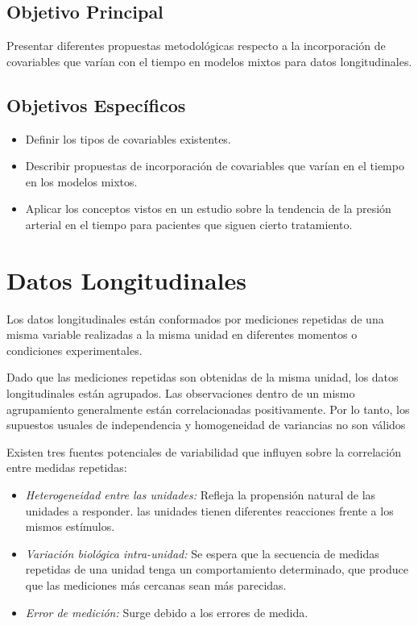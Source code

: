 \documentclass[spanish]{article}
\numberwithin{figure}{subsection}
\numberwithin{equation}{subsection}
\numberwithin{table}{subsection}
\begin{document}
\subsection{Objetivo Principal}

Presentar diferentes propuestas metodológicas respecto a la incorporación de
covariables que varían con el tiempo en modelos mixtos para datos
longitudinales.

\subsection{Objetivos Específicos}

\begin{itemize}
	\item Definir los tipos de covariables existentes.
	\item Describir propuestas de incorporación de covariables que varían en el
	tiempo en los modelos mixtos.
	\item Aplicar los conceptos vistos en un estudio sobre la tendencia de la
		  presión arterial en el tiempo para pacientes que siguen cierto
		  tratamiento.
\end{itemize}

\newpage
\section{Datos Longitudinales}

Los datos longitudinales están conformados por mediciones repetidas de una misma
variable realizadas a la misma unidad en diferentes momentos o condiciones
experimentales.

Dado que las mediciones repetidas son obtenidas de la misma unidad, los datos
longitudinales están agrupados. Las observaciones dentro de un mismo
agrupamiento generalmente están correlacionadas positivamente. Por lo tanto, los
supuestos usuales de independencia y homogeneidad de variancias no son válidos

Existen tres fuentes potenciales de variabilidad que influyen sobre la
correlación entre medidas repetidas:

\begin{itemize}
	\item \textit{Heterogeneidad entre las unidades:} Refleja la propensión
	natural de las unidades a responder. las unidades tienen diferentes
	reacciones frente a los mismos estímulos.
	\item \textit{Variación biológica intra-unidad:} Se espera que la secuencia
	de medidas repetidas de una unidad tenga un comportamiento determinado, que
	produce que las mediciones más cercanas sean más parecidas.
	\item \textit{Error de medición:} Surge debido a los errores de medida.
\end{itemize}
\end{document}
